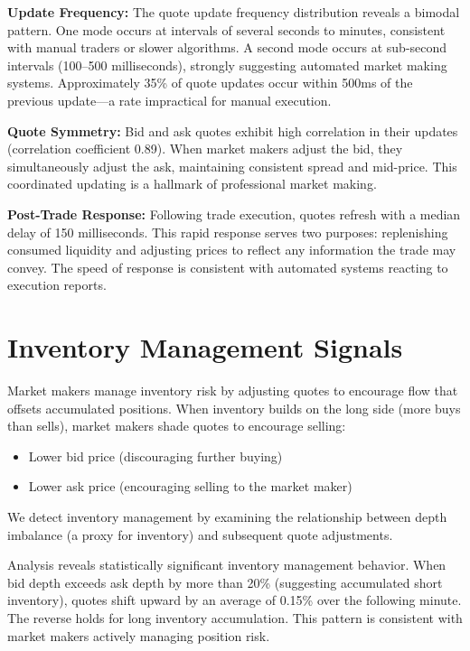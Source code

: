 \textbf{Update Frequency:} The quote update frequency distribution reveals a bimodal pattern. One mode occurs at intervals of several seconds to minutes, consistent with manual traders or slower algorithms. A second mode occurs at sub-second intervals (100--500 milliseconds), strongly suggesting automated market making systems. Approximately 35\% of quote updates occur within 500ms of the previous update---a rate impractical for manual execution.

\textbf{Quote Symmetry:} Bid and ask quotes exhibit high correlation in their updates (correlation coefficient 0.89). When market makers adjust the bid, they simultaneously adjust the ask, maintaining consistent spread and mid-price. This coordinated updating is a hallmark of professional market making.

\textbf{Post-Trade Response:} Following trade execution, quotes refresh with a median delay of 150 milliseconds. This rapid response serves two purposes: replenishing consumed liquidity and adjusting prices to reflect any information the trade may convey. The speed of response is consistent with automated systems reacting to execution reports.

\section{Inventory Management Signals}

Market makers manage inventory risk by adjusting quotes to encourage flow that offsets accumulated positions. When inventory builds on the long side (more buys than sells), market makers shade quotes to encourage selling:

\begin{itemize}
    \item Lower bid price (discouraging further buying)
    \item Lower ask price (encouraging selling to the market maker)
\end{itemize}

We detect inventory management by examining the relationship between depth imbalance (a proxy for inventory) and subsequent quote adjustments.

Analysis reveals statistically significant inventory management behavior. When bid depth exceeds ask depth by more than 20\% (suggesting accumulated short inventory), quotes shift upward by an average of 0.15\% over the following minute. The reverse holds for long inventory accumulation. This pattern is consistent with market makers actively managing position risk.

